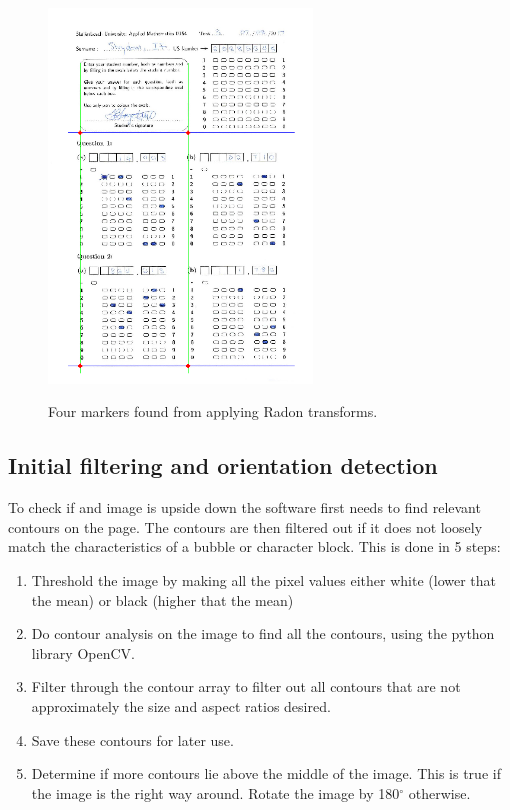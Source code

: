 \begin{figure}
  \centering
  \includegraphics[width=7cm]{RadonResults}\\
  \caption{Four markers found from applying Radon transforms.}
  \label{fig:radonResults}
\end{figure}

\subsection{Initial filtering and orientation detection}
\label{sec:InitImageFilter}

To check if and image is upside down the software first needs to find relevant contours on the page. The contours are then filtered out if it does not loosely match the characteristics of a bubble or character block. This is done in 5 steps:

\begin{enumerate}
\item Threshold the image by making all the pixel values either white (lower that the mean) or black (higher that the mean)
\item Do contour analysis on the image to find all the contours, using the python library OpenCV.
\item Filter through the contour array to filter out all contours that are not approximately the size and aspect ratios desired.
\item Save these contours for later use.
\item Determine if more contours lie above the middle of the image. This is true if the image is the right way around. Rotate the image by 180$^{\circ}$ otherwise.
\end{enumerate}

